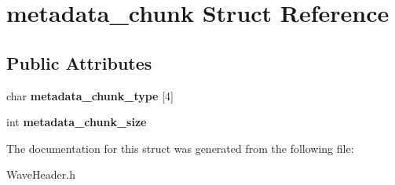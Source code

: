 \hypertarget{structmetadata__chunk}{}\section{metadata\+\_\+chunk Struct Reference}
\label{structmetadata__chunk}
\subsection*{Public Attributes}
\begin{DoxyCompactItemize}
\item 
\mbox{\label{structmetadata__chunk_a745472e568604b58fbebfbf8260a1e43}} 
char {\bfseries metadata\+\_\+chunk\+\_\+type} \mbox{[}4\mbox{]}
\item 
\mbox{\label{structmetadata__chunk_a9c643ddf4c65b6f2559f0aa7e1059fa5}} 
int {\bfseries metadata\+\_\+chunk\+\_\+size}
\end{DoxyCompactItemize}


The documentation for this struct was generated from the following file\+:\begin{DoxyCompactItemize}
\item 
Wave\+Header.\+h\end{DoxyCompactItemize}
